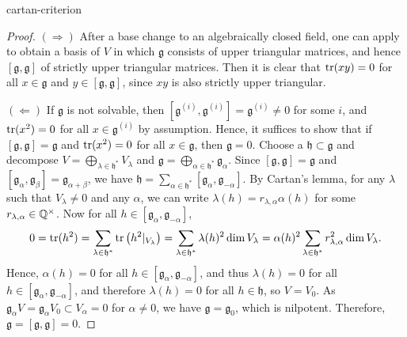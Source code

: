 \begin{example}{cartan-criterion}
    \begin{proof}
        $(\Rightarrow)$ After a base change to an algebraically closed field, one can apply  to obtain a basis of $V$ in which $\mathfrak{g}$ consists of upper triangular matrices, and hence $[\mathfrak{g}, \mathfrak{g}]$ of strictly upper triangular matrices. Then it is clear that $\operatorname{tr}(xy) = 0$ for all $x \in \mathfrak{g}$ and $y \in [\mathfrak{g}, \mathfrak{g}]$, since $xy$ is also strictly upper triangular.
        
        $(\Leftarrow)$ If $\mathfrak{g}$ is not solvable, then $[\mathfrak{g}^{(i)}, \mathfrak{g}^{(i)}] = \mathfrak{g}^{(i)} \ne 0$ for some $i$, and $\operatorname{tr}(x^2) = 0$ for all $x \in \mathfrak{g}^{(i)}$ by assumption. Hence, it suffices to show that if $[\mathfrak{g}, \mathfrak{g}] = \mathfrak{g}$ and $\operatorname{tr}(x^2) = 0$ for all $x \in \mathfrak{g}$, then $\mathfrak{g} = 0$.
        Choose a  $\mathfrak{h} \subset \mathfrak{g}$ and decompose $V = \bigoplus_{\lambda \in \mathfrak{h}^*} V_\lambda$ and $\mathfrak{g} = \bigoplus_{\alpha \in \mathfrak{h}^*} \mathfrak{g}_\alpha$. Since $[\mathfrak{g}, \mathfrak{g}] = \mathfrak{g}$ and $[\mathfrak{g}_\alpha, \mathfrak{g}_\beta] = \mathfrak{g}_{\alpha + \beta}$, we have $\mathfrak{h} = \sum_{\alpha \in \mathfrak{h}^*} [\mathfrak{g}_\alpha, \mathfrak{g}_{-\alpha}]$. 
        By Cartan's lemma, for any $\lambda$ such that $V_\lambda \ne 0$ and any $\alpha$, we can write $\lambda(h) = r_{\lambda, \alpha} \alpha(h)$ for some $r_{\lambda, \alpha} \in \mathbb{Q}^\times$. Now for all $h \in [\mathfrak{g}_\alpha, \mathfrak{g}_{-\alpha}]$,
        \[ 0 = \operatorname{tr}(h^2) = \sum_{\lambda \in \mathfrak{h}^*} \operatorname{tr}\left(h^2|_{V_\lambda}\right) = \sum_{\lambda \in \mathfrak{h}^*} \lambda(h)^2 \dim V_\lambda = \alpha(h)^2 \sum_{\lambda \in \mathfrak{h}^*} r_{\lambda, \alpha}^2 \dim V_\lambda . \]
        Hence, $\alpha(h) = 0$ for all $h \in [\mathfrak{g}_\alpha, \mathfrak{g}_{-\alpha}]$, and thus $\lambda(h) = 0$ for all $h \in [\mathfrak{g}_\alpha, \mathfrak{g}_{-\alpha}]$, and therefore $\lambda(h) = 0$ for all $h \in \mathfrak{h}$, so $V = V_0$. As $\mathfrak{g}_\alpha V = \mathfrak{g}_\alpha V_0 \subset V_\alpha = 0$ for $\alpha \ne 0$, we have $\mathfrak{g} = \mathfrak{g}_0$, which is nilpotent. Therefore, $\mathfrak{g} = [\mathfrak{g}, \mathfrak{g}] = 0$.
    \end{proof}
\end{example}

